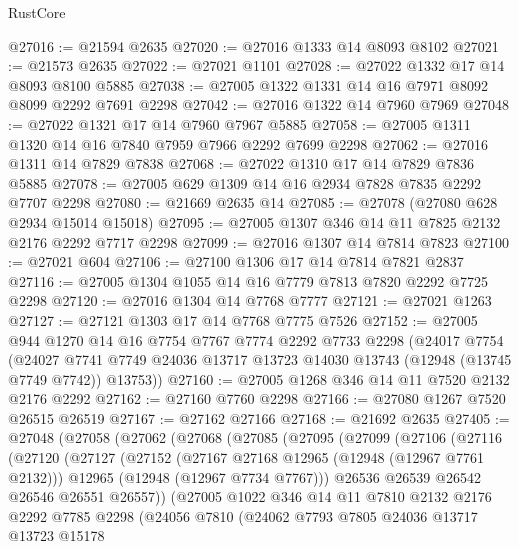 \begin{lexlean}{RustCore}
\begin{coremodule}
@27016 := @21594 @2635
@27020 := @27016 @1333 @14 @8093 @8102
@27021 := @21573 @2635
@27022 := @27021 @1101
@27028 := @27022 @1332 @17 @14 @8093 @8100 @5885
@27038 := @27005 @1322 @1331 @14 @16 @7971 @8092 @8099 @2292 @7691 @2298
@27042 := @27016 @1322 @14 @7960 @7969
@27048 := @27022 @1321 @17 @14 @7960 @7967 @5885
@27058 := @27005 @1311 @1320 @14 @16 @7840 @7959 @7966 @2292 @7699 @2298
@27062 := @27016 @1311 @14 @7829 @7838
@27068 := @27022 @1310 @17 @14 @7829 @7836 @5885
@27078 := @27005 @629 @1309 @14 @16 @2934 @7828 @7835 @2292 @7707 @2298
@27080 := @21669 @2635 @14
@27085 := @27078 (@27080 @628 @2934 @15014 @15018)
@27095 := @27005 @1307 @346 @14 @11 @7825 @2132 @2176 @2292 @7717 @2298
@27099 := @27016 @1307 @14 @7814 @7823
@27100 := @27021 @604
@27106 := @27100 @1306 @17 @14 @7814 @7821 @2837
@27116 := @27005 @1304 @1055 @14 @16 @7779 @7813 @7820 @2292 @7725 @2298
@27120 := @27016 @1304 @14 @7768 @7777
@27121 := @27021 @1263
@27127 := @27121 @1303 @17 @14 @7768 @7775 @7526
@27152 := @27005
    @944
    @1270
    @14
    @16
    @7754
    @7767
    @7774
    @2292
    @7733
    @2298
    (@24017
      @7754
      (@24027 @7741 @7749 @24036 @13717 @13723 @14030 @13743 (@12948 (@13745 @7749 @7742)) @13753))
@27160 := @27005 @1268 @346 @14 @11 @7520 @2132 @2176 @2292
@27162 := @27160 @7760 @2298
@27166 := @27080 @1267 @7520 @26515 @26519
@27167 := @27162 @27166
@27168 := @21692 @2635
@27405 := @27048
    (@27058
      (@27062
        (@27068
          (@27085
            (@27095
              (@27099
                (@27106
                  (@27116
                    (@27120
                      (@27127
                        (@27152
                          (@27167 @27168 @12965 (@12948 (@12967 @7761 @2132)))
                          @12965
                          (@12948 (@12967 @7734 @7767)))
                        @26536
                        @26539
                        @26542
                        @26546
                        @26551
                        @26557))
                    (@27005
                      @1022
                      @346
                      @14
                      @11
                      @7810
                      @2132
                      @2176
                      @2292
                      @7785
                      @2298
                      (@24056
                        @7810
                        (@24062
                          @7793
                          @7805
                          @24036
                          @13717
                          @13723
                          @15178

\end{coremodule}
\end{lexlean}
